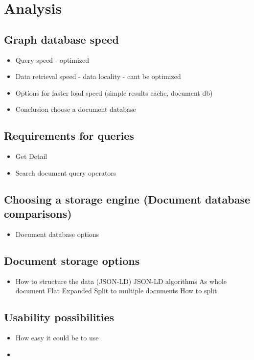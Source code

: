 \chapter{Analysis}

\section{Graph database speed}

\begin{itemize}
	\item Query speed - optimized
	\item Data retrieval speed - data locality - cant be optimized
	\item Options for faster load speed (simple results cache, document db)
	\item Conclusion choose a document database
\end{itemize}

\section{Requirements for queries}
\begin{itemize}
	\item Get Detail
	\item Search document query operators
			
\end{itemize}

\section{Choosing a storage engine (Document database comparisons)}
\begin{itemize}
	\item Document database options
\end{itemize}

\section{Document storage options}
\begin{itemize}
	\item How to structure the data (JSON-LD)
		\subitem JSON-LD algorithms
		\subitem As whole document
			\subsubitem Flat
			\subsubitem Expanded
		\subitem Split to multiple documents
			\subsubitem How to split
\end{itemize}

\section{Usability possibilities}
\begin{itemize}
	\item How easy it could be to use
	\item 
\end{itemize}

